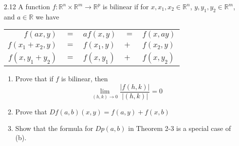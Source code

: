 \begin{enumerate}
    \item[2.12] A function \( f: \mathbb{R}^n \times \mathbb{R}^m \rightarrow \mathbb{R}^p \) is bilinear if for \( x,x_1,x_2 \in \mathbb{R}^n \), \( y,y_1,y_2 \in \mathbb{R}^m \), and \( a \in \mathbb{R} \) we have
    \begin{center}
    \begin{tabular}{r l l l l}
        \( f(ax,y) \) & \( = \) & \( af(x,y) \) & \( = \) & \( f(x,ay) \) \\
        \( f(x_1+x_2,y) \) & \( = \) & \( f(x_1,y) \) & \( + \) & \( f(x_2,y) \) \\
        \( f(x,y_1+y_2) \) & \( = \) & \( f(x,y_1) \) & \( + \) & \( f(x,y_2) \)
    \end{tabular}
    \end{center}
    
    \begin{enumerate}
        \item Prove that if \( f \) is bilinear, then
        \[
        \lim_{(h,k) \rightarrow 0} \frac{\left| f(h,k) \right|}{\left| (h,k) \right|} = 0
        \]
        
        \item Prove that \( Df(a,b) (x,y) = f(a,y) + f(x,b) \)
        
        \item Show that the formula for \( Dp(a,b) \) in Theorem 2-3 is a special case of (b).
    \end{enumerate}
    

\end{enumerate}
